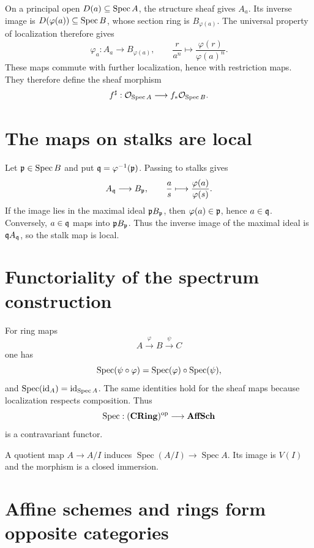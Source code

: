 On a principal open $D(a)\subseteq\operatorname{Spec} A$, the structure sheaf gives $A_a$.  Its inverse
image is $D(\varphi(a))\subseteq\operatorname{Spec} B$, whose section ring is $B_{\varphi(a)}$.
The universal property of localization therefore gives
\[
\varphi_a:A_a\longrightarrow B_{\varphi(a)},
\qquad
\frac{r}{a^n}\longmapsto\frac{\varphi(r)}{\varphi(a)^n}.
\]
These maps commute with further localization, hence with restriction maps.  They therefore
define the sheaf morphism
\[
f^\sharp:\mathcal O_{\operatorname{Spec} A}\longrightarrow f_*\mathcal O_{\operatorname{Spec} B}.
\]

\section{The maps on stalks are local}

Let $\mathfrak p\in\operatorname{Spec} B$ and put $\mathfrak q=\varphi^{-1}(\mathfrak p)$.  Passing to stalks gives
\[
A_{\mathfrak q}\longrightarrow B_{\mathfrak p},
\qquad
\frac{a}{s}\longmapsto\frac{\varphi(a)}{\varphi(s)}.
\]
If the image lies in the maximal ideal $\mathfrak p B_{\mathfrak p}$, then $\varphi(a)\in\mathfrak p$, hence
$a\in\mathfrak q$.  Conversely, $a\in\mathfrak q$ maps into $\mathfrak p B_{\mathfrak p}$.  Thus the inverse
image of the maximal ideal is $\mathfrak q A_{\mathfrak q}$, so the stalk map is local.



\section{Functoriality of the spectrum construction}

For ring maps
\[
A\xrightarrow{\varphi}B\xrightarrow{\psi}C
\]
one has
\[
\operatorname{Spec}(\psi\circ\varphi)=\operatorname{Spec}(\varphi)\circ\operatorname{Spec}(\psi),
\]
and $\operatorname{Spec}(\operatorname{id}_A)=\operatorname{id}_{\operatorname{Spec} A}$.  The same identities hold
for the sheaf maps because localization respects composition.  Thus
\[
\operatorname{Spec}:(\mathbf{CRing})^{\mathrm{op}}\longrightarrow\mathbf{AffSch}
\]
is a contravariant functor.



\begin{example}\label{ex:vi19-expand-02}
A quotient map $A\to A/I$ induces $\operatorname{Spec}(A/I)\to\operatorname{Spec}A$.  Its image is $V(I)$ and the morphism is a closed immersion.
\end{example}
\section{Affine schemes and rings form opposite categories}

